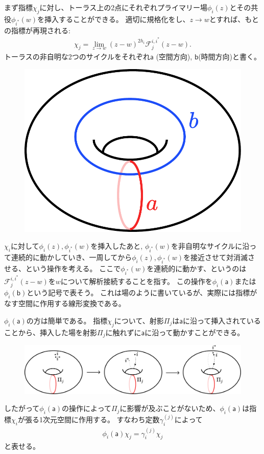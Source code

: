 \documentclass{jlreq}
\begin{document}
まず指標$χ_j$に対し、トーラス上の2点にそれぞれプライマリー場$ϕ_i(z)$とその共役$ϕ_{i^*}(w)$を挿入することができる。
適切に規格化をし、$z → w$とすれば、もとの指標が再現される:
\begin{align}
    χ_j = \lim_{z→w}(z-w)^{2h_i}ℱ^{i,i^*}_j(z-w).
\end{align}
トーラスの非自明な2つのサイクルをそれぞれ$𝖺$ (空間方向), $𝖻$(時間方向)と書く。
\begin{figure}[H]
    \centering
    \includegraphics[width=0.2\hsize]{two_cycles}
\end{figure}
$χ_i$に対して$ϕ_i(z), ϕ_{i^*}(w)$を挿入したあと, $ϕ_{i^*}(w)$を非自明なサイクルに沿って連続的に動かしていき、一周してから$ϕ_i(z), ϕ_{i^*}(w)$を接近させて対消滅させる、という操作を考える。
ここで$ϕ_{i^*}(w)$を連続的に動かす、というのは$ℱ^{i,i^*}_j(z-w)$を$w$について解析接続することを指す。
この操作を$ϕ_i(𝖺)$または$ϕ_i(𝖻)$という記号で表そう。
これは場のように書いているが、実際には指標がなす空間に作用する線形変換である。

$ϕ_i(𝖺)$の方は簡単である。
指標$χ_j$について、射影$Π_j$は$𝖺$に沿って挿入されていることから、挿入した場を射影$Π_j$に触れずに$𝖺$に沿って動かすことができる。
\begin{figure}[H]
    \centering
    \includegraphics[width=0.8\hsize]{phi_a}
\end{figure}
したがって$ϕ_i(𝖺)$の操作によって$Π_j$に影響が及ぶことがないため、$ϕ_i(𝖺)$は指標$χ_i$が張る1次元空間に作用する。
すなわち定数$γ^{(j)}_i$によって
\begin{align}
    ϕ_i(𝖺)χ_j = γ_i^{(j)}χ_j
\end{align}
と表せる。
\end{document}
